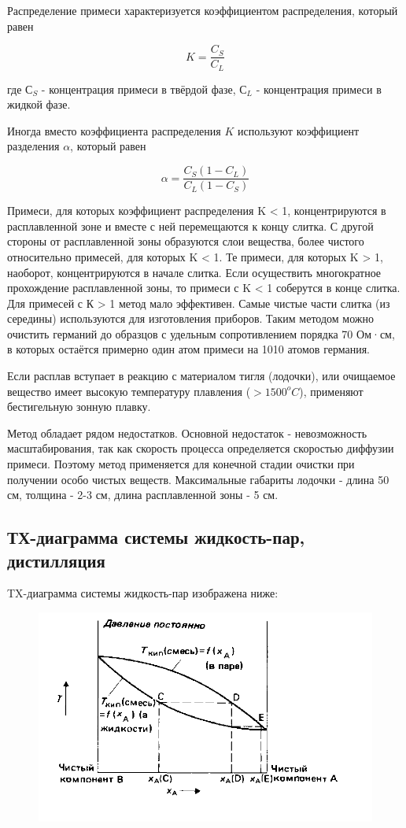 \documentclass[14pt,a4paper]{scrartcl}
\begin{document}
Распределение примеси характеризуется коэффициентом распределения, который равен

$$ K={\frac {C_{S}}{C_{L}}}$$

где $С_S$ - концентрация примеси в твёрдой фазе, $С_L$ - концентрация примеси в жидкой фазе.

Иногда вместо коэффициента распределения $K$ используют коэффициент разделения $\alpha$, который равен

$$\alpha ={\frac {C_{S}(1-C_{L})}{C_{L}(1-C_{S})}}$$

Примеси, для которых коэффициент распределения K < 1, концентрируются в расплавленной зоне и вместе с ней перемещаются к концу слитка. С другой стороны от расплавленной зоны образуются слои вещества, более чистого относительно примесей, для которых K < 1. Те примеси, для которых K > 1, наоборот, концентрируются в начале слитка. Если осуществить многократное прохождение расплавленной зоны, то примеси с K < 1 соберутся в конце слитка. Для примесей с К > 1 метод мало эффективен. Самые чистые части слитка (из середины) используются для изготовления приборов. Таким методом можно очистить германий до образцов с удельным сопротивлением порядка 70 Ом·см, в которых остаётся примерно один атом примеси на 1010 атомов германия.

Если расплав вступает в реакцию с материалом тигля (лодочки), или очищаемое вещество имеет высокую температуру плавления ($>1500^o C$), применяют бестигельную зонную плавку.

Метод обладает рядом недостатков. Основной недостаток - невозможность масштабирования, так как скорость процесса определяется скоростью диффузии примеси. Поэтому метод применяется для конечной стадии очистки при получении особо чистых веществ. Максимальные габариты лодочки - длина 50 см, толщина - 2-3 см, длина расплавленной зоны - 5 см.
\subsection*{ТХ-диаграмма системы жидкость­-пар, дистилляция}
TX-диаграмма системы жидкость-пар изображена ниже:
\begin{figure}[htp]
\centering
\includegraphics[scale=1.50]{vapor-diagram.png}
\caption{}
\label{}
\end{figure}
\end{document}
